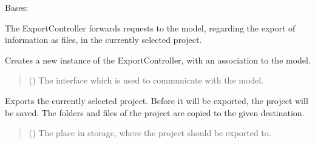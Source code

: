 \documentclass[letterpaper,10pt,english]{sphinxmanual}
\begin{document}
\begin{fulllineitems}
\label{\detokenize{apidoc/src.osm_configurator.control:src.osm_configurator.control.export_controller.ExportController}}
\pysigstartsignatures
{}
\pysigstopsignatures
\sphinxAtStartPar
Bases: 

\sphinxAtStartPar
The ExportController forwards requests to the model,
regarding the export of information as files, in the currently selected project.

\begin{fulllineitems}
\label{\detokenize{apidoc/src.osm_configurator.control:src.osm_configurator.control.export_controller.ExportController.__init__}}
\pysigstartsignatures
{}
\pysigstopsignatures
\sphinxAtStartPar
Creates a new instance of the ExportController, with an association to the model.
\begin{quote}\begin{description}
\sphinxAtStartPar
{} ({\hyperref[\detokenize{apidoc/src.osm_configurator.model.application:src.osm_configurator.model.application.application_interface.IApplication}]{}}) \textendash{} The interface which is used to communicate with the model.

\end{description}\end{quote}

\end{fulllineitems}


\begin{fulllineitems}
\label{\detokenize{apidoc/src.osm_configurator.control:src.osm_configurator.control.export_controller.ExportController.export_project}}
\pysigstartsignatures
{}
\pysigstopsignatures
\sphinxAtStartPar
Exports the currently selected project.
Before it will be exported, the project will be saved.
The folders and files of the project are copied to the given destination.
\begin{quote}\begin{description}
\sphinxAtStartPar
{} () \textendash{} The place in storage, where the project should be exported to.


\end{description}
\end{quote}
\end{fulllineitems}
\end{fulllineitems}
\end{document}
